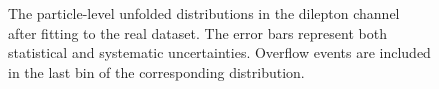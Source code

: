 \begin{figure}[ht]
  \quad\quad
  \caption{The particle-level unfolded distributions in the dilepton channel after fitting to the real dataset. 
  The error bars represent both statistical and systematic uncertainties. Overflow events are included in the last bin of the corresponding distribution.}
  \label{fig:pt_unfolded_dilep_dist_realdata_1}

\end{figure}

